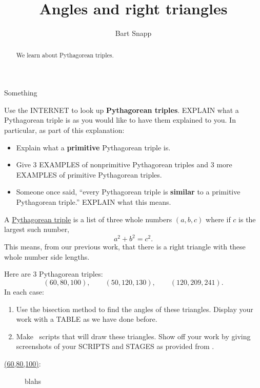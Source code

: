 \documentclass[noauthor,nooutcomes,12pt]{ximera}
\title{Angles and right triangles}
\author{Bart Snapp}
\begin{document}
\begin{abstract}
  We learn about Pythagorean triples.
\end{abstract}
\maketitle

\begin{listOutcomes}
\item Something
\end{listOutcomes}
\mynewpage


\begin{question}
  Use the INTERNET to look up \textbf{Pythagorean triples}. EXPLAIN
  what a Pythagorean triple is as you would like to have them
  explained to you. In particular, as part of this explanation:
  \begin{itemize}
    \item Explain what a \textbf{primitive} Pythagorean triple is.
    \item Give $3$ EXAMPLES of nonprimitive Pythagorean triples and
      $3$ more EXAMPLES of primitive Pythagorean triples.
    \item Someone once said, ``every Pythagorean triple is
      \textbf{similar} to a primitive Pythagorean triple.'' EXPLAIN
      what this means.
  \end{itemize}
  \begin{freeResponse}
    A \underline{Pythagorean triple} is a list of three whole numbers
    $(a,b,c)$ where if $c$ is the largest such number,
    \[
    a^2 + b^2 = c^2.
    \]
    This means, from our previous work, that there is a right triangle
    with these whole number side lengths.
  \end{freeResponse}
\end{question}
\mynewpage

\begin{question}
  Here are $3$ Pythagorean triples:
  \[
  (60,80,100), \qquad (50,120,130), \qquad (120, 209, 241).
  \]
  In each case:
  \begin{enumerate}
        \item Use the bisection method to find the angles of these
          triangles. Display your work with a TABLE as we have done
          before.
        \item Make \snap\ scripts that will draw these
          triangles. Show off your work by giving screenshots of your
          SCRIPTS and STAGES as provided from \snap.
  \end{enumerate}
  \begin{freeResponse}
    \begin{description}
      \item[\underline{(60,80,100)}:] blahs
    \end{description}
  \end{freeResponse}
\end{question}
\mynewpage
\end{document}
